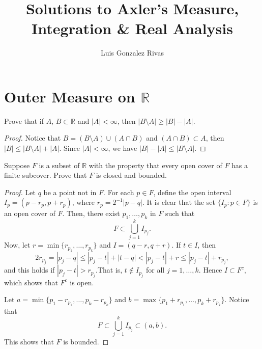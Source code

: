 \documentclass[14.5pt]{article}
\title{Solutions to Axler's Measure, Integration \& Real Analysis }
\author{Luis Gonzalez Rivas}
\newcommand{\R}{\mathbb{R}}
\newenvironment{problem}[2][Problem]{\begin{mdframed}[backgroundcolor=gray!10, leftline = false, rightline=false, linewidth=0.25pt]  \begin{trivlist}
\item[\hskip \labelsep {\bfseries #1}\hskip \labelsep {\bfseries #2.}]}{\end{trivlist} \end{mdframed}  }
\begin{document}
\maketitle
\section*{Outer Measure on $\R$} %
\begin{problem}{2A.3}Prove that if $A$, $B \subset \R$ and $|A| < \infty$, then $|B\setminus A | \geq | B | - |A|$.
\end{problem}
\begin{proof}
    Notice that $B = (B \setminus A) \cup (A \cap B)$ and $(A \cap B) \subset A$, then $|B| \leq | B \setminus A | + |A|.$ Since $|A| < \infty$, we have $| B | - | A | \leq | B \setminus A|.$
\end{proof}

\begin{problem}{2A.4} Suppose $F$ is a subset of $\R$ with the property that every open cover of $F$ has a finite subcover. Prove that $F$ is closed and bounded.
\end{problem}
\begin{proof}
    Let $q$ be a point not in $F$. For each $p\in F$, define the open interval $I_p = (p - r_p, p + r_p)$, where $r_p = 2^{-1} | p - q |.$ It is clear that the set $\{I_p: p \in F\}$ is an open cover of $F$. Then, there exist ${p_1}, \ldots, {p_k}$ in $F$ such that 
    $$F \subset \bigcup_{j=1}^k I_{p_j}.$$
    Now, let $r = \min\{r_{p_1},\ldots, r_{p_k}\}$ and $I = (q - r, q + r)$. If $t \in I$, then
    $$2 r_{p_j} = |p_j - q | \leq |p_j - t | + | t - q| < |p_j - t | + r \leq |p_j - t | + r_{p_j},$$
    and this holds if $|p_j - t | > r_{p_j}$.That is, $t \notin I_{p_j}$ for all $j = 1, \ldots, k.$ Hence $I \subset F^c$, which shows that $F^c$ is open.
    
    Let $a = \min\{p_1 - r_{p_1}, \ldots, p_k - r_{p_k}\}$ and $b = \max\{p_1 + r_{p_1}, \ldots, p_k + r_{p_k}\}$. Notice that $$F \subset \bigcup_{j=1}^k I_{p_j} \subset (a, b).$$
    This shows that $F$ is bounded.
\end{proof}
\end{document}
